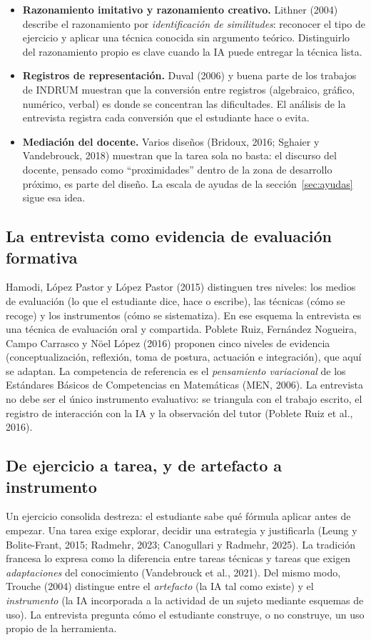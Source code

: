 \documentclass[11pt,letterpaper]{article}
\newcounter{preg}
\begin{document}
\begin{itemize}
  \item \textbf{Razonamiento imitativo y razonamiento creativo.} Lithner (2004) describe el razonamiento por \emph{identificación de similitudes}: reconocer el tipo de ejercicio y aplicar una técnica conocida sin argumento teórico. Distinguirlo del razonamiento propio es clave cuando la IA puede entregar la técnica lista.
  \item \textbf{Registros de representación.} Duval (2006) y buena parte de los trabajos de INDRUM muestran que la conversión entre registros (algebraico, gráfico, numérico, verbal) es donde se concentran las dificultades. El análisis de la entrevista registra cada conversión que el estudiante hace o evita.
  \item \textbf{Mediación del docente.} Varios diseños (Bridoux, 2016; Sghaier y Vandebrouck, 2018) muestran que la tarea sola no basta: el discurso del docente, pensado como ``proximidades'' dentro de la zona de desarrollo próximo, es parte del diseño. La escala de ayudas de la sección~\ref{sec:ayudas} sigue esa idea.
\end{itemize}

\subsection{La entrevista como evidencia de evaluación formativa}
Hamodi, López Pastor y López Pastor (2015) distinguen tres niveles: los medios de evaluación (lo que el estudiante dice, hace o escribe), las técnicas (cómo se recoge) y los instrumentos (cómo se sistematiza). En ese esquema la entrevista es una técnica de evaluación oral y compartida. Poblete Ruiz, Fernández Nogueira, Campo Carrasco y Nöel López (2016) proponen cinco niveles de evidencia (conceptualización, reflexión, toma de postura, actuación e integración), que aquí se adaptan. La competencia de referencia es el \emph{pensamiento variacional} de los Estándares Básicos de Competencias en Matemáticas (MEN, 2006). La entrevista no debe ser el único instrumento evaluativo: se triangula con el trabajo escrito, el registro de interacción con la IA y la observación del tutor (Poblete Ruiz et al., 2016).

\subsection{De ejercicio a tarea, y de artefacto a instrumento}
Un ejercicio consolida destreza: el estudiante sabe qué fórmula aplicar antes de empezar. Una tarea exige explorar, decidir una estrategia y justificarla (Leung y Bolite-Frant, 2015; Radmehr, 2023; Canogullari y Radmehr, 2025). La tradición francesa lo expresa como la diferencia entre tareas técnicas y tareas que exigen \emph{adaptaciones} del conocimiento (Vandebrouck et al., 2021). Del mismo modo, Trouche (2004) distingue entre el \emph{artefacto} (la IA tal como existe) y el \emph{instrumento} (la IA incorporada a la actividad de un sujeto mediante esquemas de uso). La entrevista pregunta cómo el estudiante construye, o no construye, un uso propio de la herramienta.
\end{document}
